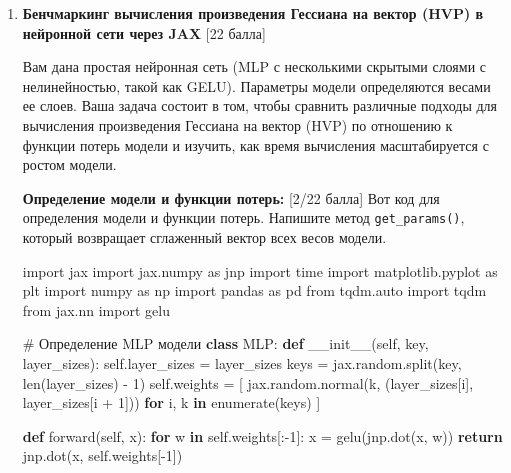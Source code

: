 \documentclass[
  russian,
  letterpaper,
  DIV=11,
  numbers=noendperiod]{scrartcl}
\newenvironment{Shaded}{\begin{snugshade}}{\end{snugshade}}
\newcommand{\BuiltInTok}[1]{\textcolor[rgb]{0.00,0.23,0.31}{#1}}
\newcommand{\CommentTok}[1]{\textcolor[rgb]{0.37,0.37,0.37}{#1}}
\newcommand{\ControlFlowTok}[1]{\textcolor[rgb]{0.00,0.23,0.31}{\textbf{#1}}}
\newcommand{\DecValTok}[1]{\textcolor[rgb]{0.68,0.00,0.00}{#1}}
\newcommand{\FunctionTok}[1]{\textcolor[rgb]{0.28,0.35,0.67}{#1}}
\newcommand{\ImportTok}[1]{\textcolor[rgb]{0.00,0.46,0.62}{#1}}
\newcommand{\KeywordTok}[1]{\textcolor[rgb]{0.00,0.23,0.31}{\textbf{#1}}}
\newcommand{\NormalTok}[1]{\textcolor[rgb]{0.00,0.23,0.31}{#1}}
\newcommand{\OperatorTok}[1]{\textcolor[rgb]{0.37,0.37,0.37}{#1}}
\newcommand{\VariableTok}[1]{\textcolor[rgb]{0.07,0.07,0.07}{#1}}
\begin{document}
\begin{enumerate}
\def\labelenumi{\arabic{enumi}.}
\item
  \textbf{Бенчмаркинг вычисления произведения Гессиана на вектор (HVP) в
  нейронной сети через JAX} {[}22 балла{]}

  Вам дана простая нейронная сеть (MLP с несколькими скрытыми слоями с
  нелинейностью, такой как GELU). Параметры модели определяются весами
  ее слоев. Ваша задача состоит в том, чтобы сравнить различные подходы
  для вычисления произведения Гессиана на вектор (HVP) по отношению к
  функции потерь модели и изучить, как время вычисления масштабируется с
  ростом модели.

  \textbf{Определение модели и функции потерь:} {[}2/22 балла{]} Вот код
  для определения модели и функции потерь. Напишите метод
  \texttt{get\_params()}, который возвращает сглаженный вектор всех
  весов модели.

\begin{Shaded}
\begin{Highlighting}[]
\ImportTok{import}\NormalTok{ jax}
\ImportTok{import}\NormalTok{ jax.numpy }\ImportTok{as}\NormalTok{ jnp}
\ImportTok{import}\NormalTok{ time}
\ImportTok{import}\NormalTok{ matplotlib.pyplot }\ImportTok{as}\NormalTok{ plt}
\ImportTok{import}\NormalTok{ numpy }\ImportTok{as}\NormalTok{ np}
\ImportTok{import}\NormalTok{ pandas }\ImportTok{as}\NormalTok{ pd}
\ImportTok{from}\NormalTok{ tqdm.auto }\ImportTok{import}\NormalTok{ tqdm}
\ImportTok{from}\NormalTok{ jax.nn }\ImportTok{import}\NormalTok{ gelu}

\CommentTok{\# Определение MLP модели}
\KeywordTok{class}\NormalTok{ MLP:}
    \KeywordTok{def} \FunctionTok{\_\_init\_\_}\NormalTok{(}\VariableTok{self}\NormalTok{, key, layer\_sizes):}
        \VariableTok{self}\NormalTok{.layer\_sizes }\OperatorTok{=}\NormalTok{ layer\_sizes}
\NormalTok{        keys }\OperatorTok{=}\NormalTok{ jax.random.split(key, }\BuiltInTok{len}\NormalTok{(layer\_sizes) }\OperatorTok{{-}} \DecValTok{1}\NormalTok{)}
        \VariableTok{self}\NormalTok{.weights }\OperatorTok{=}\NormalTok{ [}
\NormalTok{            jax.random.normal(k, (layer\_sizes[i], layer\_sizes[i }\OperatorTok{+} \DecValTok{1}\NormalTok{]))}
            \ControlFlowTok{for}\NormalTok{ i, k }\KeywordTok{in} \BuiltInTok{enumerate}\NormalTok{(keys)}
\NormalTok{            ]}

    \KeywordTok{def}\NormalTok{ forward(}\VariableTok{self}\NormalTok{, x):}
        \ControlFlowTok{for}\NormalTok{ w }\KeywordTok{in} \VariableTok{self}\NormalTok{.weights[:}\OperatorTok{{-}}\DecValTok{1}\NormalTok{]:}
\NormalTok{            x }\OperatorTok{=}\NormalTok{ gelu(jnp.dot(x, w))}
        \ControlFlowTok{return}\NormalTok{ jnp.dot(x, }\VariableTok{self}\NormalTok{.weights[}\OperatorTok{{-}}\DecValTok{1}\NormalTok{])}


\end{Highlighting}
\end{Shaded}
\end{enumerate}
\end{document}

